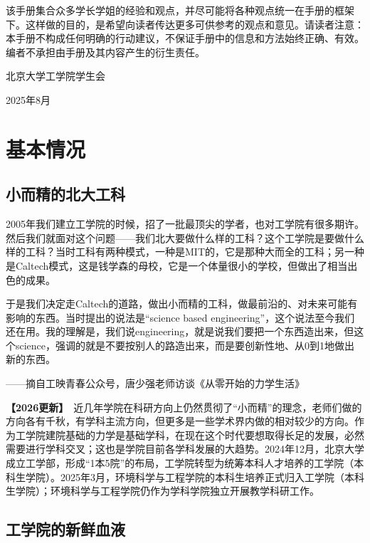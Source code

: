 \documentclass[11pt,oneside]{book}
\newcommand{\updateMark}{\textcolor{chaph}{\textbf{【2026更新】}}\ }
\begin{document}
\vspace{10pt}

该手册集合众多学长学姐的经验和观点，并尽可能将各种观点统一在手册的框架下。这样做的目的，是希望向读者传达更多可供参考的观点和意见。请读者注意：本手册不构成任何明确的行动建议，不保证手册中的信息和方法始终正确、有效。编者不承担由手册及其内容产生的衍生责任。
\begin{flushright}
	北京大学工学院学生会
	
	2025年8月
\end{flushright}

\tableofcontents

\mainmatter
	
\chapter{基本情况}
\section{小而精的北大工科}
2005年我们建立工学院的时候，招了一批最顶尖的学者，也对工学院有很多期许。然后我们就面对这个问题——我们北大要做什么样的工科？这个工学院是要做什么样的工科？当时工科有两种模式，一种是MIT的，它是那种大而全的工科；另一种是Caltech模式，这是钱学森的母校，它是一个体量很小的学校，但做出了相当出色的成果。

于是我们决定走Caltech的道路，做出小而精的工科，做最前沿的、对未来可能有影响的东西。当时提出的说法是“science based engineering”，这个说法至今我们还在用。我的理解是，我们说engineering，就是说我们要把一个东西造出来，但这个science，强调的就是不要按别人的路造出来，而是要创新性地、从0到1地做出新的东西。
\begin{flushright}
	——摘自工映青春公众号，唐少强老师访谈《从零开始的力学生活》

\end{flushright}

\vspace{10pt}

\updateMark 近几年学院在科研方向上仍然贯彻了“小而精”的理念，老师们做的方向各有千秋，有学科主流方向，但更多是一些学术界内做的相对较少的方向。作为工学院建院基础的力学是基础学科，在现在这个时代要想取得长足的发展，必然需要进行学科交叉；这也是学院目前各学科发展的大趋势。2024年12月，北京大学成立工学部，形成“1本5院”的布局，工学院转型为统筹本科人才培养的工学院（本科生学院）。2025年3月，环境科学与工程学院的本科生培养正式归入工学院（本科生学院）；环境科学与工程学院仍作为学科学院独立开展教学科研工作。

\section{工学院的新鲜血液}    
\end{document}
